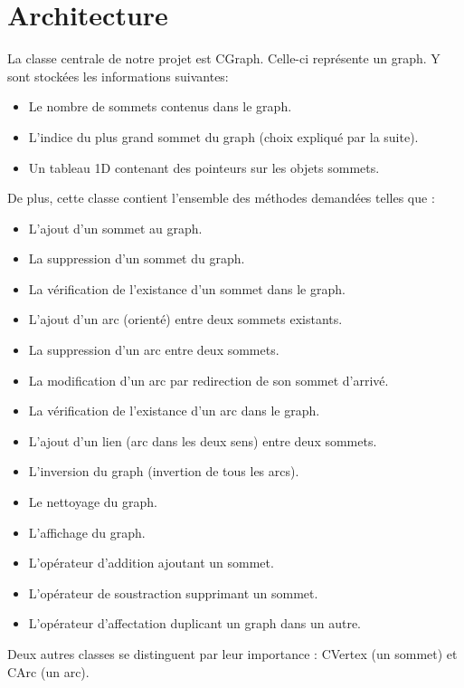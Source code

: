 	\chapter{Architecture}
		La classe centrale de notre projet est CGraph. Celle-ci représente un graph. Y sont stockées les informations suivantes:
		\begin{itemize}
			\item Le nombre de sommets contenus dans le graph.
			\item L'indice du plus grand sommet du graph (choix expliqué par la suite).
			\item Un tableau 1D contenant des pointeurs sur les objets sommets.\\
		\end{itemize}
		De plus, cette classe contient l'ensemble des méthodes demandées telles que :
		\begin{itemize}
			\item L'ajout d'un sommet au graph.
			\item La suppression d'un sommet du graph.
			\item La vérification de l'existance d'un sommet dans le graph.
			\item L'ajout d'un arc (orienté) entre deux sommets existants.
			\item La suppression d'un arc entre deux sommets.
			\item La modification d'un arc par redirection de son sommet d'arrivé.
			\item La vérification de l'existance d'un arc dans le graph.
			\item L'ajout d'un lien (arc dans les deux sens) entre deux sommets.
			\item L'inversion du graph (invertion de tous les arcs).
			\item Le nettoyage du graph.
			\item L'affichage du graph.
			\item L'opérateur d'addition ajoutant un sommet.
			\item L'opérateur de soustraction supprimant un sommet.
			\item L'opérateur d'affectation duplicant un graph dans un autre.\\
		\end{itemize}
		
		Deux autres classes se distinguent par leur importance : CVertex (un sommet) et CArc (un arc).\\
		

